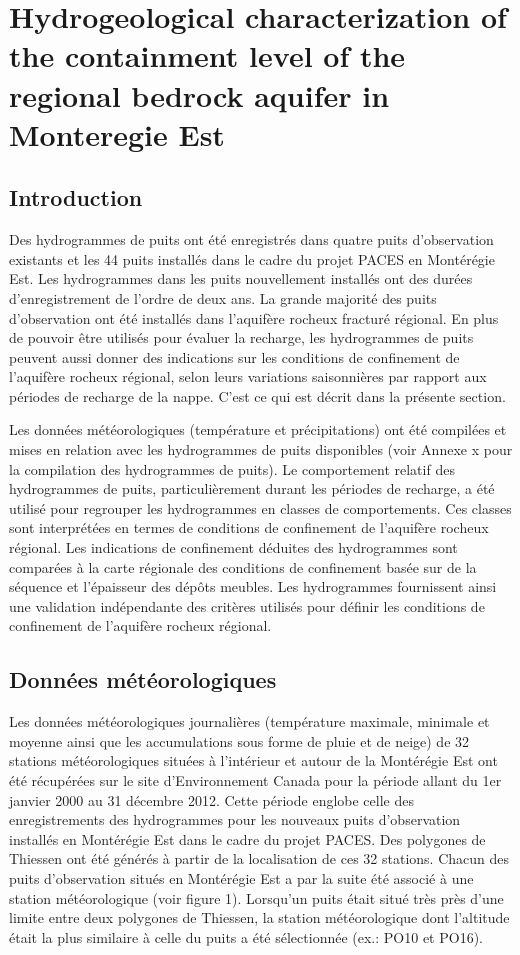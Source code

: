 \documentclass[WHATMANUAL.tex]{subfiles}
\begin{document}
\chapter{Hydrogeological characterization of the containment level of the regional bedrock aquifer in Monteregie Est}

\section{Introduction}

Des hydrogrammes de puits ont été enregistrés dans quatre puits d’observation existants et les 44 puits installés dans le cadre du projet PACES en Montérégie Est. Les hydrogrammes dans les puits nouvellement installés ont des durées d’enregistrement de l’ordre de deux ans. La grande majorité des puits d’observation ont été installés dans l’aquifère rocheux fracturé régional. En plus de pouvoir être utilisés pour évaluer la recharge, les hydrogrammes de puits peuvent aussi donner des indications sur les conditions de confinement de l’aquifère rocheux régional, selon leurs variations saisonnières par rapport aux périodes de recharge de la nappe. C’est ce qui est décrit dans la présente section.

Les données météorologiques (température et précipitations) ont été compilées et mises en relation avec les hydrogrammes de puits disponibles (voir Annexe x pour la compilation des hydrogrammes de puits). Le comportement relatif des hydrogrammes de puits, particulièrement durant les périodes de recharge, a été utilisé pour regrouper les hydrogrammes en classes de comportements. Ces classes sont interprétées en termes de conditions de confinement de l’aquifère rocheux régional. Les indications de confinement déduites des hydrogrammes sont comparées à la carte régionale des conditions de confinement basée sur de la séquence et l’épaisseur des dépôts meubles. Les hydrogrammes fournissent ainsi une validation indépendante des critères utilisés pour définir les conditions de confinement de l’aquifère rocheux régional.

\section{Données météorologiques}

Les données météorologiques journalières (température maximale, minimale et moyenne ainsi que les accumulations sous forme de pluie et de neige) de 32 stations météorologiques situées à l'intérieur et autour de la Montérégie Est ont été récupérées sur le site d'Environnement Canada pour la période allant du 1er janvier 2000 au 31 décembre 2012. Cette période englobe celle des enregistrements des hydrogrammes pour les nouveaux puits d’observation installés en Montérégie Est dans le cadre du projet PACES. Des polygones de Thiessen ont été générés à partir de la localisation de ces 32 stations. Chacun des puits d'observation situés en Montérégie Est a par la suite été associé à une station météorologique (voir figure 1). Lorsqu'un puits était situé très près d'une limite entre deux polygones de Thiessen, la station météorologique dont l'altitude était la plus similaire à celle du puits a été sélectionnée (ex.: PO10 et PO16). 
\end{document}
